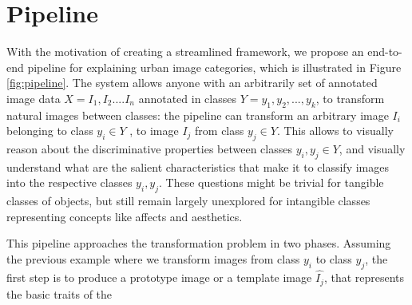 \section{Pipeline}
With the motivation of creating a streamlined framework, we propose an end-to-end pipeline for explaining urban image categories, which is illustrated in Figure \ref{fig:pipeline}.%
The system allows anyone with an arbitrarily set of annotated image data $ X = { I_1, I_2 ... . I_n  }$ annotated in classes $Y = {y_1 , y_2 , ... ,y_k}$, to transform natural images between classes: the pipeline can transform an arbitrary image $I_i$ belonging to class $y_i \in Y$ , to image $I_j$ from class $y_j \in Y$.  This allows  to visually reason about the discriminative properties between classes $y_i , y_j \in Y$, and visually understand what are the salient characteristics %
that make it to classify images into the respective classes $y_i,y_j$. These questions might be trivial for tangible classes of objects, but still remain largely unexplored for intangible classes representing concepts like affects and aesthetics.
\par 
This pipeline approaches the transformation problem in two phases. Assuming the previous example where we transform images from class $y_i$ to class $y_j$, the first step is to produce a prototype image or a template image $\hat{I_j}$, that represents the basic traits of the %
